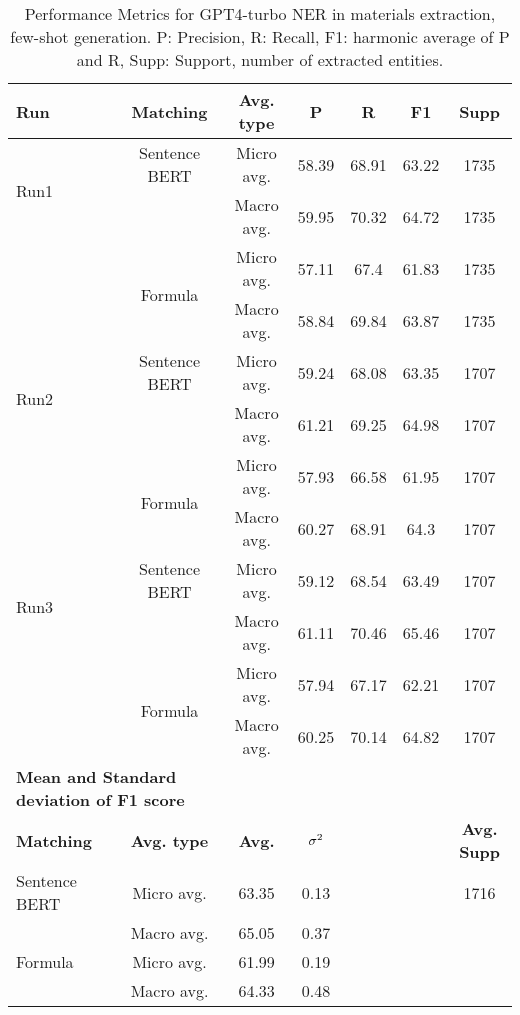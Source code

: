 \begin{table}[htbp]
\small
  \centering
  \caption{Performance Metrics for GPT4-turbo NER in materials extraction, few-shot generation. P: Precision, R: Recall, F1: harmonic average of P and R, Supp: Support, number of extracted entities.}
  \begin{tabular}{lcccccc}
    \toprule
    \textbf{Run} & \textbf{Matching} & \textbf{Avg. type} & \textbf{P} & \textbf{R} & \textbf{F1} & \textbf{Supp} \\
    \midrule
    \multirow{2}{*}{Run1} & Sentence BERT & Micro avg. & 58.39 & 68.91 & 63.22 & 1735 \\
    & & Macro avg. & 59.95 & 70.32 & 64.72 & 1735 \\
    \cmidrule{2-7}
    & \multirow{2}{*}{Formula} & Micro avg. & 57.11 & 67.4 & 61.83 & 1735 \\
    & & Macro avg. & 58.84 & 69.84 & 63.87 & 1735 \\
    \midrule
    \multirow{2}{*}{Run2} & Sentence BERT & Micro avg. & 59.24 & 68.08 & 63.35 & 1707 \\
    & & Macro avg. & 61.21 & 69.25 & 64.98 & 1707 \\
    \cmidrule{2-7}
    & \multirow{2}{*}{Formula} & Micro avg. & 57.93 & 66.58 & 61.95 & 1707 \\
    & & Macro avg. & 60.27 & 68.91 & 64.3 & 1707 \\
    \midrule
    \multirow{2}{*}{Run3} & Sentence BERT & Micro avg. & 59.12 & 68.54 & 63.49 & 1707 \\
    & & Macro avg. & 61.11 & 70.46 & 65.46 & 1707 \\
    \cmidrule{2-7}
    & \multirow{2}{*}{Formula} & Micro avg. & 57.94 & 67.17 & 62.21 & 1707 \\
    & & Macro avg. & 60.25 & 70.14 & 64.82 & 1707 \\
    \midrule
    \multicolumn{2}{l}{\textbf{Mean and Standard deviation of F1 score}} & & & & & \\
    \midrule
    \textbf{Matching} & \textbf{Avg. type} & \textbf{Avg.} & $\sigma\textsuperscript{2}$ & & & \textbf{Avg. Supp}\\
    Sentence BERT & Micro avg. & 63.35 & 0.13 & & & 1716 \\
    & Macro avg. & 65.05 & 0.37 & & & \\
    Formula & Micro avg. & 61.99 & 0.19 & & & \\
    & Macro avg. & 64.33 & 0.48 & & & \\
    \bottomrule
  \end{tabular}
\end{table}


